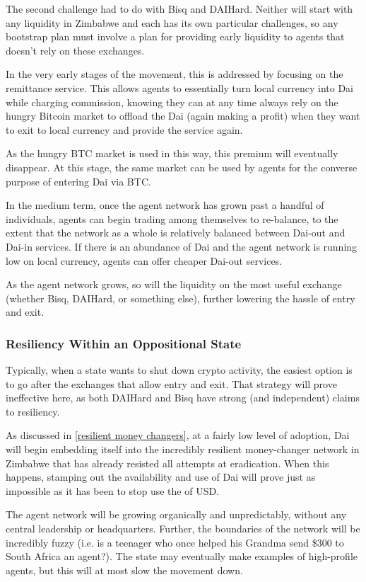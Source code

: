 \documentclass{article}
\begin{document}
The second challenge had to do with Bisq and DAIHard. Neither will start with any liquidity in Zimbabwe and each has its own particular challenges, so any bootstrap plan must involve a plan for providing early liquidity to agents that doesn't rely on these exchanges.

In the very early stages of the movement, this is addressed by focusing on the remittance service. This allows agents to essentially turn local currency into Dai while charging commission, knowing they can at any time always rely on the hungry Bitcoin market to offload the Dai (again making a profit) when they want to exit to local currency and provide the service again.

As the hungry BTC market is used in this way, this premium will eventually disappear. At this stage, the same market can be used by agents for the converse purpose of entering Dai via BTC.

In the medium term, once the agent network has grown past a handful of individuals, agents can begin trading among themselves to re-balance, to the extent that the network as a whole is relatively balanced between Dai-out and Dai-in services. If there is an abundance of Dai and the agent network is running low on local currency, agents can offer cheaper Dai-out services.

As the agent network grows, so will the liquidity on the most useful exchange (whether Bisq, DAIHard, or something else), further lowering the hassle of entry and exit.

\subsubsection{Resiliency Within an Oppositional State} \label{state resilient}

Typically, when a state wants to shut down crypto activity, the easiest option is to go after the exchanges that allow entry and exit. That strategy will prove ineffective here, as both DAIHard and Bisq have strong (and independent) claims to resiliency.

As discussed in \ref{resilient money changers}, at a fairly low level of adoption, Dai will begin embedding itself into the incredibly resilient money-changer network in Zimbabwe that has already resisted all attempts at eradication. When this happens, stamping out the availability and use of Dai will prove just as impossible as it has been to stop use the of USD.

The agent network will be growing organically and unpredictably, without any central leadership or headquarters. Further, the boundaries of the network will be incredibly fuzzy (i.e. is a teenager who once helped his Grandma send \$300 to South Africa an agent?). The state may eventually make examples of high-profile agents, but this will at most slow the movement down.
\end{document}
